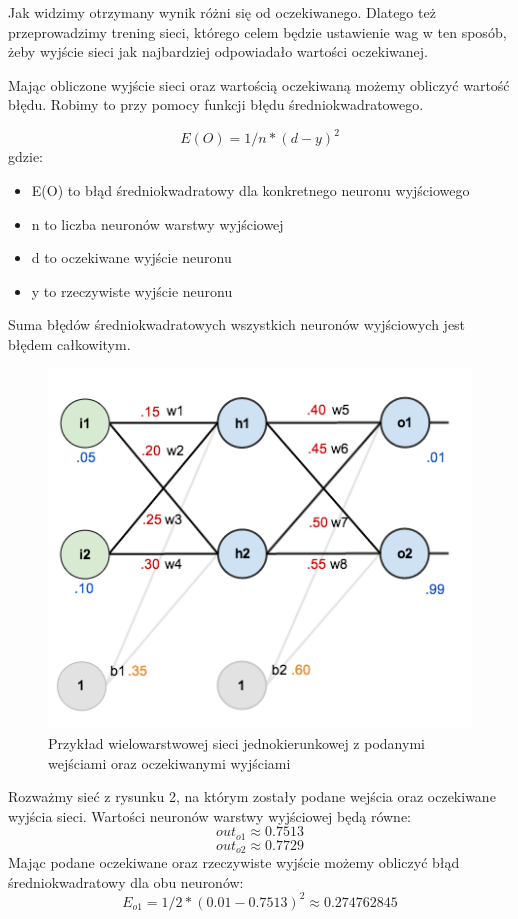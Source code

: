 Jak widzimy otrzymany wynik różni się od oczekiwanego.
Dlatego też przeprowadzimy trening sieci, którego celem będzie ustawienie wag w ten sposób,
żeby wyjście sieci jak najbardziej odpowiadało wartości oczekiwanej.

Mając obliczone wyjście sieci oraz wartością oczekiwaną możemy obliczyć wartość błędu. Robimy to przy pomocy funkcji błędu średniokwadratowego.

\[
    E(O)=1/n*(d-y)^2
\]
gdzie:
\begin{itemize}
  \item E(O) to błąd średniokwadratowy dla konkretnego neuronu wyjściowego
  \item n to liczba neuronów warstwy wyjściowej
  \item d to oczekiwane wyjście neuronu
  \item y to rzeczywiste wyjście neuronu
\end{itemize}

Suma błędów średniokwadratowych wszystkich neuronów wyjściowych jest błędem całkowitym.

\begin{figure}[!ht]
  \includegraphics[width=\linewidth]{images/feed-forward-diagram-with-values.png}
  \caption{Przykład wielowarstwowej sieci jednokierunkowej z podanymi wejściami oraz oczekiwanymi wyjściami}
\end{figure}

Rozważmy sieć z rysunku 2, na którym zostały podane wejścia oraz oczekiwane wyjścia sieci.
Wartości neuronów warstwy wyjściowej będą równe:
\[
    out_{o1} \approx 0.7513
\]
\[
    out_{o2} \approx 0.7729
\]
Mając podane oczekiwane oraz rzeczywiste wyjście możemy obliczyć błąd średniokwadratowy dla obu neuronów:
\[
    E_{o1} = 1/2 * (0.01-0.7513)^2 \approx 0.274762845 
\]

